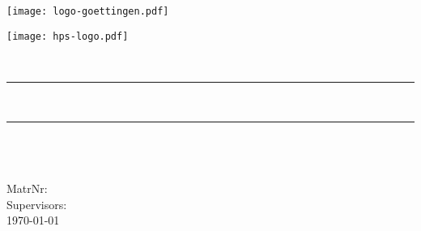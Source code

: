 
\begin{titlepage}
\begin{minipage}[t]{0.6\textwidth}
\begin{flushleft}
\texttt{[image: logo-goettingen.pdf]}
\end{flushleft}
\end{minipage}
\begin{minipage}[t]{0.4\textwidth}
\begin{center}
\qquad\texttt{[image: hps-logo.pdf]}
\end{center}
\end{minipage}

\begin{center}

\vspace*{.06\textheight}
\LARGE \thesistype\\[0.5cm]

\rule{.9\linewidth}{.6pt} \\[0.4cm] %
{\huge \bfseries \thesistitle}\vspace{0.4cm}
\rule{.9\linewidth}{.6pt} \\[1.5cm] %

\Large\authorname\\
\hfill\\
\large MatrNr: \matrikelnumber\\ \vfill
Supervisors: \supervisor
\vfill
\university\\
\department
\vfill
{\large \today}\\[4cm] %

\vfill
\end{center}
\end{titlepage}
